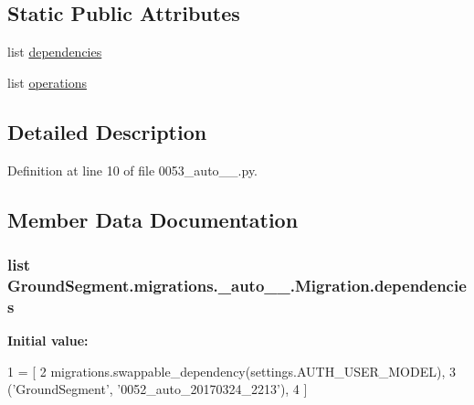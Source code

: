 \subsection*{Static Public Attributes}
\begin{DoxyCompactItemize}
\item 
list \hyperlink{class_ground_segment_1_1migrations_1_10053__auto__20170325__1256_1_1_migration_a4fb2d4cf76dbcd97b6b6f57593274579}{dependencies}
\item 
list \hyperlink{class_ground_segment_1_1migrations_1_10053__auto__20170325__1256_1_1_migration_aa76520d4d9f417fa02d64c94d16d2c92}{operations}
\end{DoxyCompactItemize}


\subsection{Detailed Description}


Definition at line 10 of file 0053\+\_\+auto\+\_\+\_.\+py.



\subsection{Member Data Documentation}
\hypertarget{class_ground_segment_1_1migrations_1_10053__auto__20170325__1256_1_1_migration_a4fb2d4cf76dbcd97b6b6f57593274579}{}
\subsubsection[{dependencies}]{\setlength{\rightskip}{0pt plus 5cm}list Ground\+Segment.\+migrations.\+\_\+auto\+\_\+\_.\+Migration.\+dependencies\hspace{0.3cm}{\ttfamily [static]}}\label{class_ground_segment_1_1migrations_1_10053__auto__20170325__1256_1_1_migration_a4fb2d4cf76dbcd97b6b6f57593274579}
{\bfseries Initial value\+:}
\begin{DoxyCode}
1 = [
2         migrations.swappable\_dependency(settings.AUTH\_USER\_MODEL),
3         (\textcolor{stringliteral}{'GroundSegment'}, \textcolor{stringliteral}{'0052\_auto\_20170324\_2213'}),
4     ]
\end{DoxyCode}


